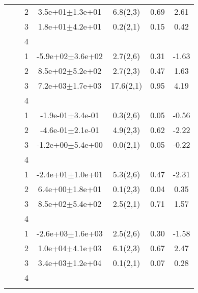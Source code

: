 \begin{longtable}[H]{llccccS[table-format=-2.2, table-space-text-post = {***}]}
   &  & 2 &  3.5e+01$\pm$1.3e+01 & 6.8(2,3) & 0.69 & 2.61 \\* 
   &  & 3 &  1.8e+01$\pm$4.2e+01 & 0.2(2,1) & 0.15 & 0.42 \\* 
   &  & 4 &  &  &  &  \\
   \midrule
{} & {} & 1 & -5.9e+02$\pm$3.6e+02 & 2.7(2,6) & 0.31 & -1.63 \\* 
   &  & 2 &  8.5e+02$\pm$5.2e+02 & 2.7(2,3) & 0.47 & 1.63 \\* 
   &  & 3 &  7.2e+03$\pm$1.7e+03 & 17.6(2,1) & 0.95 & 4.19 \\* 
   &  & 4 &  &  &  &  \\
   \midrule
{} & {} & 1 & -1.9e-01$\pm$3.4e-01 & 0.3(2,6) & 0.05 & -0.56 \\* 
   &  & 2 & -4.6e-01$\pm$2.1e-01 & 4.9(2,3) & 0.62 & -2.22 \\* 
   &  & 3 & -1.2e+00$\pm$5.4e+00 & 0.0(2,1) & 0.05 & -0.22 \\* 
   &  & 4 &  &  &  &  \\
   \midrule
{} & {} & 1 & -2.4e+01$\pm$1.0e+01 & 5.3(2,6) & 0.47 & -2.31 \\* 
   &  & 2 &  6.4e+00$\pm$1.8e+01 & 0.1(2,3) & 0.04 & 0.35 \\* 
   &  & 3 &  8.5e+02$\pm$5.4e+02 & 2.5(2,1) & 0.71 & 1.57 \\* 
   &  & 4 &  &  &  &  \\
   \midrule
{} & {} & 1 & -2.6e+03$\pm$1.6e+03 & 2.5(2,6) & 0.30 & -1.58 \\* 
   &  & 2 &  1.0e+04$\pm$4.1e+03 & 6.1(2,3) & 0.67 & 2.47 \\* 
   &  & 3 &  3.4e+03$\pm$1.2e+04 & 0.1(2,1) & 0.07 & 0.28 \\* 
   &  & 4 &  &  &  &  \\
   \bottomrule
\label{tls:bivar_lm_summ_veg_type}
\end{longtable}

